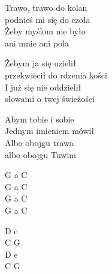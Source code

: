\begin{text}
    Trawo, trawo do kolan\\
    podnieś mi się do czoła\\
    Żeby myślom nie było\\
    ani mnie ani pola

    \vin Żebym ja się uzielił\\
    \vin przekwiecił do rdzenia kości\\
    \vin I już się nie oddzielił\\
    \vin słowami o twej świeżości

    Abym tobie i sobie\\
    Jednym imieniem mówił\\
    Albo obojgu trawa\\
    albo obojgu Tuwim
\end{text}
\begin{chord}
    G a C\\
    G a C\\
    G a C\\
    G a C

    D e\\
    C G\\
    D e\\
    C G
\end{chord}